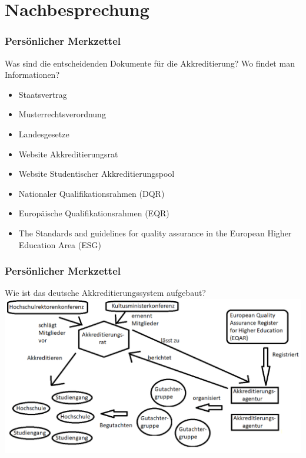 \documentclass{beamer}
\begin{document}
\section{Nachbesprechung}
\frame{\tableofcontents[currentsection]}
\begin{frame}
\frametitle{Persönlicher Merkzettel}
Was sind die entscheidenden Dokumente für die Akkreditierung? Wo findet man Informationen?
\vspace{0.5cm}
\begin{itemize}
\item Staatsvertrag
\item Musterrechtsverordnung
\item Landesgesetze
\end{itemize}
\pause
\begin{itemize}
\item Website Akkreditierungsrat
\item Website Studentischer Akkreditierungspool
\end{itemize}
\pause
\begin{itemize}
\item Nationaler Qualifikationsrahmen (DQR)
\item Europäische Qualifikationsrahmen (EQR)
\item The Standards and guidelines for quality assurance in the European Higher Education Area (ESG)
\end{itemize}
\end{frame}
\begin{frame}
\frametitle{Persönlicher Merkzettel}
Wie ist das deutsche Akkreditierungssystem aufgebaut?
\vspace{0.5cm}
  \includegraphics[width=1\textwidth]{Schaubild2.png}
\end{frame}
\end{document}
